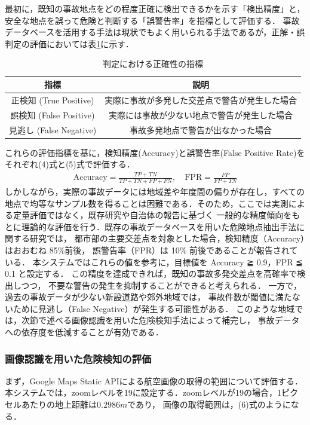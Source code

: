 \documentclass[uplatex,dvipdfmx]{jsarticle}
\begin{document}
最初に，既知の事故地点をどの程度正確に検出できるかを示す「検出精度」と，安全な地点を誤って危険と判断する「誤警告率」を指標として評価する．
事故データベースを活用する手法は現状でもよく用いられる手法であるが，正解・誤判定の評価においては表\ref{tab:confusion_matrix}に示す．
\begin{table}[H]
  \centering
  \caption{判定における正確性の指標}
  \label{tab:confusion_matrix}
  \begin{tabular}{|c|c|}
    \hline
    指標 & 説明 \\ \hline
    正検知 (True Positive) & 実際に事故が多発した交差点で警告が発生した場合 \\ \hline
    誤検知 (False Positive) & 実際には事故が少ない地点で警告が発生した場合 \\ \hline
    見逃し (False Negative) & 事故多発地点で警告が出なかった場合 \\ \hline
  \end{tabular}
\end{table}
これらの評価指標を基に，検知精度(Accuracy)と誤警告率(False Positive Rate)をそれぞれ(4)式と(5)式で評価する．
\begin{align}
  \mathrm{Accuracy} = \frac{TP + TN}{TP + TN + FP + FN}, \quad
  \mathrm{FPR} = \frac{FP}{FP + TN}
\end{align}
しかしながら，実際の事故データには地域差や年度間の偏りが存在し，すべての地点で均等なサンプル数を得ることは困難である．そのため，ここでは実測による定量評価ではなく，既存研究や自治体の報告に基づく
一般的な精度傾向をもとに理論的な評価を行う．既存の事故データベースを用いた危険地点抽出手法に関する研究では，
都市部の主要交差点を対象とした場合，検知精度（Accuracy）はおおむね 85\%前後，
誤警告率（FPR）は 10\% 前後であることが報告されている\cite{ref:accident_detection}．
本システムではこれらの値を参考に，目標値を Accuracy ≧ 0.9，FPR ≦ 0.1 と設定する．
この精度を達成できれば，既知の事故多発交差点を高確率で検出しつつ，
不要な警告の発生を抑制することができると考えられる．
一方で，過去の事故データが少ない新設道路や郊外地域では，
事故件数が閾値に満たないために見逃し（False Negative）が発生する可能性がある．
このような地域では，次節で述べる画像認識を用いた危険検知手法によって補完し，
事故データへの依存度を低減することが有効である．

\subsubsection{画像認識を用いた危険検知の評価}
まず，Google Maps Static APIによる航空画像の取得の範囲について評価する．
本システムでは，zoomレベルを19に設定する．zoomレベルが19の場合，1ピクセルあたりの地上距離は$0.2986m$であり，
画像の取得範囲は，(6)式のようになる\cite{ref:zoomrevel}．
\end{document}
